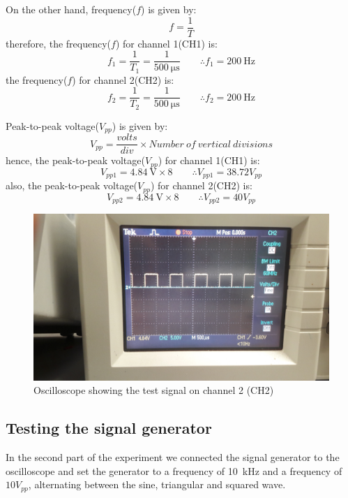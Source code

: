 \documentclass[letterpaper]{article}
\begin{document}
On the other hand, frequency($f$) is given by:
\[f = \frac{1}{T}\]
therefore, the frequency($f$) for channel 1(CH1) is:
\[f_1 = \frac{1}{T_1} = \frac{1}{\SI{500}{\micro\second}}\qquad \therefore f_1 = \SI{200}{\hertz}\]
the frequency($f$) for channel 2(CH2) is:
\[f_2 = \frac{1}{T_2} = \frac{1}{\SI{500}{\micro\second}}\qquad \therefore f_2 = \SI{200}{\hertz}\]

Peak-to-peak voltage($V_{pp}$) is given by:
\[V_{pp} = \frac{volts}{div}\times Number\ of\ vertical\ divisions\]
hence, the peak-to-peak voltage($V_{pp}$) for channel 1(CH1) is:
\[V_{pp1} = \SI{4.84}{\volt}\times8\qquad\therefore V_{pp1} = 38.72V_{pp}\]
also, the peak-to-peak voltage($V_{pp}$) for channel 2(CH2) is:
\[V_{pp2} = \SI{4.84}{\volt}\times8\qquad\therefore V_{pp2} = 40V_{pp}\]
\begin{figure}[H]
    \centering
    \includegraphics[width=.7\linewidth,angle=180]{img/part1/4}
    \caption{Oscilloscope showing the test signal on channel 2 (CH2)}
\end{figure}
\subsection{Testing the signal generator}
In the second part of the experiment we connected the signal generator to the oscilloscope and
set the generator to a frequency of \SI{10}{\kilo\hertz} and a frequency of $10 V_{pp}$,
alternating between the sine, triangular and squared wave.\\[2ex]
\end{document}
